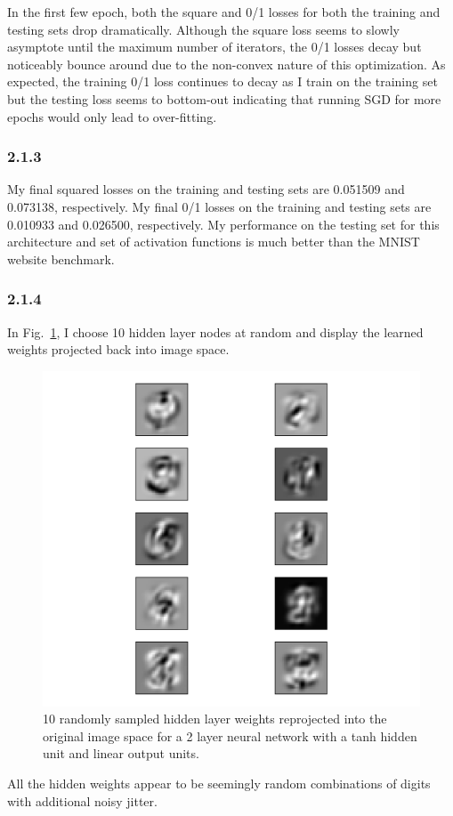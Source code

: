 \documentclass[12pt]{amsart}
\begin{document}
In the first few epoch, both the square and 0/1 losses for both the training and testing sets drop dramatically.  Although the square loss seems to slowly asymptote until the maximum number of iterators, the 0/1 losses decay but noticeably bounce around due to the non-convex nature of this optimization.  As expected, the training 0/1 loss continues to decay as I train on the training set but the testing loss seems to bottom-out indicating that running SGD for more epochs would only lead to over-fitting.

\subsubsection*{2.1.3}
My final squared losses on the training and testing sets are 0.051509 and 0.073138, respectively.  My final 0/1 losses on the training and testing sets are 0.010933 and 0.026500, respectively.  My performance on the testing set for this architecture and set of activation functions is much better than the MNIST website benchmark.

\subsubsection*{2.1.4}
In Fig.~\ref{fig:tanh_linear_hidden}, I choose 10 hidden layer nodes at random and display the learned weights projected back into image space.
\begin{figure}[H]
	\includegraphics[width=\columnwidth]{tanh_linear_hidden.pdf}
    \caption{10 randomly sampled hidden layer weights reprojected into the original image space for a 2 layer neural network with a tanh hidden unit and linear output units.}
    \label{fig:tanh_linear_hidden}
\end{figure}
All the hidden weights appear to be seemingly random combinations of digits with additional noisy jitter.
\end{document}

